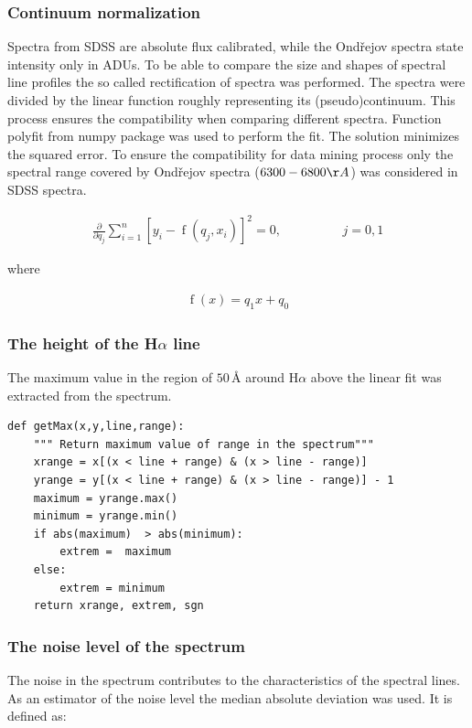 \subsubsection{Continuum normalization}
Spectra from SDSS are absolute flux calibrated, while the Ond\v{r}ejov
spectra state intensity only in ADUs. To be able to compare the size
and shapes of spectral line profiles the so called rectification of
spectra was performed. The spectra were divided by the linear function
roughly representing its (pseudo)continuum. This process ensures the
compatibility when comparing different spectra. Function polyfit from
numpy package was used to perform the fit. The solution minimizes the
squared error. To ensure the compatibility for data mining process
only the spectral range covered by Ond\v{r}ejov spectra
($6300-6800\AA$) was considered in SDSS spectra.


\begin{align}
  \frac{\partial}{\partial q_j} \sum_{i = 1}^n{[y_i -
    \operatorname{f}(q_j, x_i) ]^2} = 0,\hspace{2cm} j = 0,1
\end{align}

where 

\begin{align}
\operatorname{f}(x) = q_1x + q_0  
\end{align}


\subsubsection{The height of the H$\alpha$ line}
The maximum value in the region of $50\,\textrm{\AA}$ around H$\alpha$
above the linear fit was extracted from the spectrum.

\begin{lstlisting}
def getMax(x,y,line,range):
    """ Return maximum value of range in the spectrum"""
    xrange = x[(x < line + range) & (x > line - range)]
    yrange = y[(x < line + range) & (x > line - range)] - 1
    maximum = yrange.max()
    minimum = yrange.min()
    if abs(maximum)  > abs(minimum):
        extrem =  maximum 
    else:
        extrem = minimum 
    return xrange, extrem, sgn
\end{lstlisting}

\subsubsection{The noise level of the spectrum}
The noise in the spectrum contributes to the characteristics of the
spectral lines. As an estimator of the noise level the median
absolute deviation was used. It is defined as:


